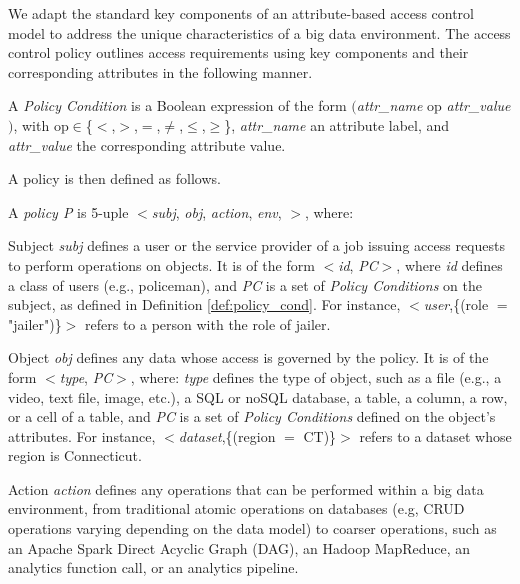 We adapt the standard key components of an attribute-based access control model to address the unique characteristics of a big data environment.
The access control policy outlines access requirements using key components and their corresponding attributes in the following manner.

\begin{definition}\label{def:policy_cond}
  A \emph{Policy Condition} is a Boolean expression of the form $($\emph{attr\_name} op \emph{attr\_value}$)$, with op$\in$\{$<$,$>$,$=$,$\neq$,$\leq$,$\geq$\}, \emph{attr\_name} an attribute label, and \emph{attr\_value} the corresponding attribute value.
\end{definition}

A policy is then defined as follows.

\begin{definition}[Policy]\label{def:policy_rule}
  A {\it policy P} is 5-uple $<$\textit{subj}, \textit{obj}, \textit{action}, \textit{env}, \textit{\TF}$>$, where:
  \begin{description}
    \item Subject \textit{subj} defines a user or the service provider of a job issuing access requests to perform operations on objects.
          It is of the form $<$\emph{id}, \emph{PC}$>$, where \emph{id} defines a class of users (e.g., policeman), and \emph{PC} is a set of \emph{Policy Conditions} on the subject, as defined in Definition \ref{def:policy_cond}.
          For instance, $<$\emph{user},\{(role $=$ "jailer")\}$>$ refers to a person with the role of jailer.

    \item Object \textit{obj} defines any data whose access is governed by the policy.
          It is of the form $<$\emph{type}, \emph{PC}$>$, where: \emph{type} defines the type of object, such as a file (e.g., a video, text file, image, etc.), a SQL or noSQL database, a table, a column, a row, or a cell of a table, and \emph{PC} is a set of \emph{Policy Conditions} defined on the object's attributes.
          For instance, $<$\emph{dataset},\{(region $=$ CT)\}$>$ refers to a dataset whose region is Connecticut.

    \item Action \textit{action} defines any operations that can be performed within a big data environment, from traditional atomic operations on databases (e.g, CRUD operations varying depending on the data model) to coarser operations, such as an Apache Spark Direct Acyclic Graph (DAG), an Hadoop MapReduce, an analytics function call, or an analytics pipeline.


\end{description}
\end{definition}
